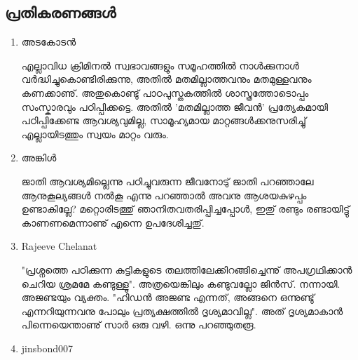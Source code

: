 \subsection*{പ്രതികരണങ്ങള്‍}

\begin{enumerate}

\item{അടകോടന്‍}

എല്ലാവിധ ക്രിമിനല്‍ സ്വഭാവങ്ങളും സമൂഹത്തില്‍ നാള്‍ക്കുനാള്‍ വര്‍ദ്ധിച്ചുകൊണ്ടിരിക്കുന്നു, 
അതില്‍ മതമില്ലാത്തവനും മതമുള്ളവനും കണക്കാണു്. അതുകൊണ്ടു് പാഠപുസ്തകത്തില്‍ ശാസ്ത്രത്തോടൊപ്പം സംസ്കാരവും 
പഠിപ്പിക്കട്ടെ. അതില്‍ 'മതമില്ലാത്ത ജീവന്‍' പ്രത്യേകമായി പഠിപ്പിക്കേണ്ട ആവശ്യവുമില്ല, സാമൂഹ്യമായ മാറ്റങ്ങള്‍ക്കനുസരിച്ചു് 
എല്ലായിടത്തും സ്വയം മാറ്റം വരും.

\item{അങ്കിള്‍}

ജാതി ആവശ്യമില്ലെന്നു പഠിച്ചുവരുന്ന ജീവനോടു് ജാതി പറഞ്ഞാലേ ആനുകൂല്യങ്ങള്‍ നല്‍കൂ എന്നു പറഞ്ഞാല്‍ അവനു 
ആശയകുഴപ്പം ഉണ്ടാകില്ലേ? മറ്റൊരിടത്തു് ഞാനിതവതരിപ്പിച്ചപ്പോള്‍, ഇതു് രണ്ടും രണ്ടായിട്ടു് കാണണമെന്നാണു് എന്നെ 
ഉപദേശിച്ചതു്.

\item{Rajeeve Chelanat}

"പ്രശ്നത്തെ പഠിക്കുന്ന കുട്ടികളുടെ തലത്തിലേക്കിറങ്ങിച്ചെന്നു് അപഗ്രഥിക്കാന്‍ ചെറിയ ശ്രമമേ കണ്ടുള്ളൂ". അത്രയെങ്കിലും 
കണ്ടുവല്ലോ ജിന്‍സ്. നന്നായി. അജണ്ടയും വ്യക്തം. "ഹിഡന്‍ അജണ്ട എന്നത്, അങ്ങനെ ഒന്നുണ്ടു് എന്നറിയുന്നവനു 
പോലും പ്രത്യക്ഷത്തില്‍ ദൃശ്യമാവില്ല". അത് ദൃശ്യമാകാന്‍ പിന്നെയെന്താണു് സാര്‍ ഒരു വഴി. ഒന്നു പറഞ്ഞുതരൂ.

\item{jinsbond007}


\end{enumerate}
